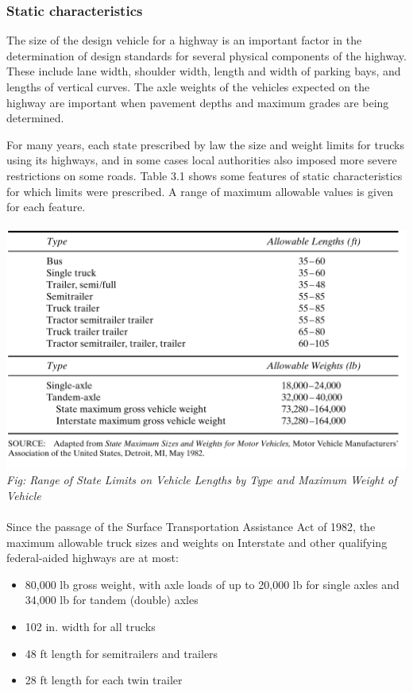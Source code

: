 \subsubsection{Static characteristics}
The size of the design vehicle for a highway is an important factor in the determination of design standards for several physical components of the highway. These include lane width, shoulder width, length and width of parking bays, and lengths of vertical curves. The axle weights of the vehicles expected on the highway are important when pavement depths and maximum grades are being determined.\\
\par
For many years, each state prescribed by law the size and weight limits for trucks using its highways, and in some cases local authorities also imposed more severe restrictions on some roads. Table 3.1 shows some features of static characteristics for which limits were prescribed. A range of maximum allowable values is given for each feature.
\\\\
\includegraphics{gfx/fig5.png}
\emph{Fig: Range of State Limits on Vehicle Lengths by Type and Maximum Weight of Vehicle}
\\\\
Since the passage of the Surface Transportation Assistance Act of 1982, the maximum allowable truck sizes and weights on Interstate and other qualifying federal-aided highways are at most:
\begin{itemize}
	\item 80,000 lb gross weight, with axle loads of up to 20,000 lb for single axles and 34,000 lb for tandem (double) axles
	\item 102 in. width for all trucks
	\item 48 ft length for semitrailers and trailers
	\item 28 ft length for each twin trailer
\end{itemize}
